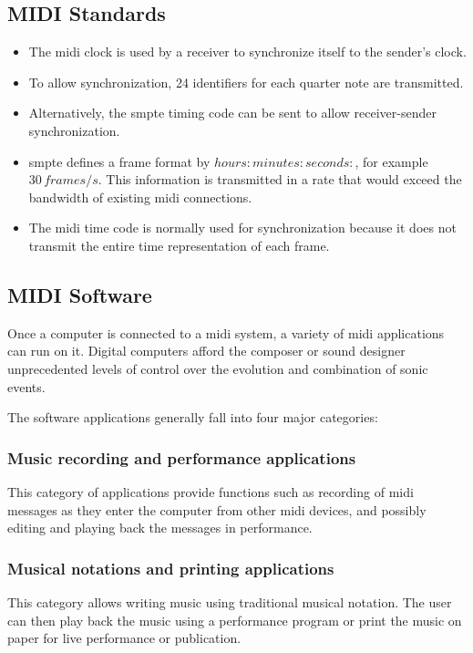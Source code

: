 \subsection[Standards]{MIDI Standards}
\begin{itemize}
	\item The \gls{midi} clock is used by a receiver to synchronize itself to the sender’s clock.
	\item To allow synchronization, 24 identifiers for each quarter note are transmitted. 
	\item Alternatively, the \gls{smpte} timing code
	can be sent to allow receiver-sender synchronization. 
	\item \gls{smpte} defines a frame format by
	\(hours:minutes:seconds:\), for example \(30\, frames/s\). This information is transmitted in a rate that would exceed the bandwidth of existing \gls{midi} connections.
	\item The \gls{midi} time code is normally used for synchronization because it does not transmit the entire time representation of each frame.
\end{itemize}


\subsection[Software]{MIDI Software}
Once a computer is connected to a \gls{midi} system, a variety of \gls{midi} applications can run on it. Digital computers afford the composer or sound designer unprecedented levels of control over the evolution and combination of sonic events.

The software applications generally fall into four major categories:

\subsubsection*{Music recording and performance applications}
This category of applications provide functions such as recording of \gls{midi} messages as they enter the computer from other \gls{midi} devices, and possibly editing and playing back the messages in performance.
			
 \subsubsection*{Musical notations and printing applications}
This category allows writing music using traditional musical notation. The user can then play back the music using a performance program or print the music on paper for live performance or publication.
			
